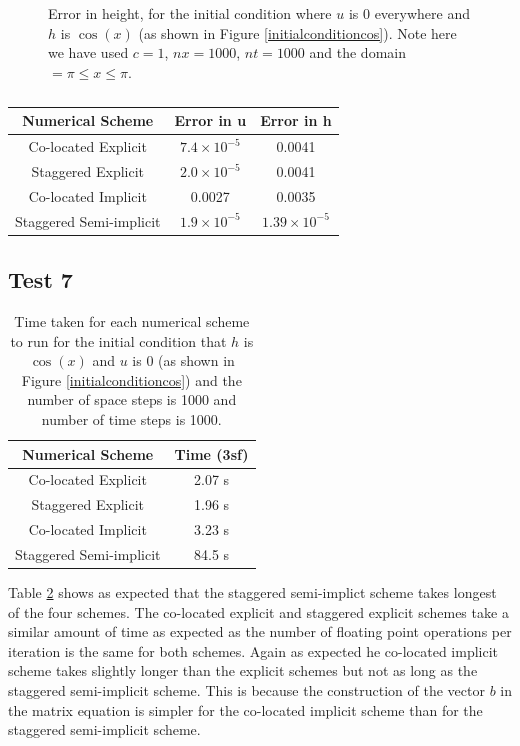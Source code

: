 \documentclass[a4paper,12pt, notitlepage]{article}
\begin{document}
{\begin{figure} [H]
\begin{minipage}{.5\textwidth}
		\caption{\label{error_height} Error in height, for the initial condition where $u$ is 0 everywhere and $h$ is $\cos(x)$ (as shown in Figure \ref{initialconditioncos}). Note here we have used $c = 1$, $nx = 1000$, $nt = 1000$ and the domain $=\pi\leq x \leq \pi$.} 
	\end{minipage}
\end{figure}



\begin{table}[H]
	\centering
	\begin{tabular}{|c | c| c|} 
		\hline
		\textbf{Numerical Scheme} & \textbf{Error in u} & \textbf{Error in h}  \\
		\hline
		Co-located Explicit & $7.4 \times 10^{-5}$ & 0.0041\\ 
		\hline
		Staggered Explicit &  $2.0 \times 10^{-5}$ & 0.0041\\
		\hline
		Co-located  Implicit & 0.0027 & 0.0035 \\
		\hline
		Staggered Semi-implicit & $1.9 \times 10^{-5}$ & $1.39\times 10 ^{-5}$ \\
		\hline
	\end{tabular}
	\caption{}
	\label{errortable}
\end{table}

\subsection{Test 7}

\begin{table}[H]
	\centering
	\begin{tabular}{|c | c|} 
		\hline
		\textbf{Numerical Scheme} & \textbf{Time (3sf)}  \\
		\hline
		Co-located Explicit & 2.07 s \\ 
		\hline
	    Staggered Explicit & 1.96 s \\
		\hline
		Co-located  Implicit & 3.23 s \\
		\hline
		Staggered Semi-implicit & 84.5 s \\
		\hline
	\end{tabular}
\caption{Time taken for each numerical scheme to run for the initial condition that $h$ is $\cos(x)$ and $u$ is $0$ (as shown in Figure \ref{initialconditioncos}) and the number of space steps is 1000 and number of time steps is 1000.}
\label{timingtable}
\end{table}

Table \ref{timingtable} shows as expected that the staggered semi-implict scheme takes longest of the four schemes. The co-located explicit and staggered explicit schemes take a similar amount of time as expected as the number of floating point operations per iteration is the same for both schemes. Again as expected he co-located implicit scheme takes slightly longer than the explicit schemes but not as long as the staggered semi-implicit scheme. This is because the construction of the vector $b$ in the matrix equation is simpler for the co-located implicit scheme than for the staggered semi-implicit scheme.

}
\end{document}
